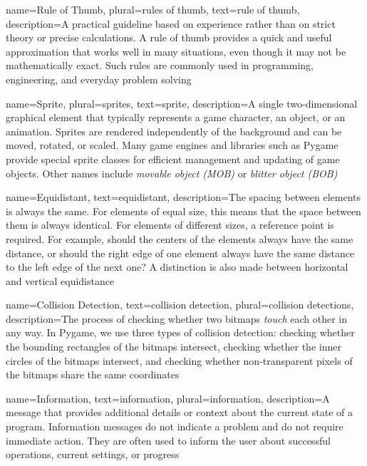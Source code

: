 {
	name={Rule of Thumb},
	plural={rules of thumb},
	text={rule of thumb},
	description={A practical guideline based on experience rather than on strict theory or precise calculations. A rule of thumb provides a quick and useful approximation that works well in many situations, even though it may not be mathematically exact. Such rules are commonly used in programming, engineering, and everyday problem solving}
}

{
	name={Sprite},
	plural={sprites},
	text={sprite},
	description={A single two-dimensional graphical element that typically represents a game character, an object, or an animation. Sprites are rendered independently of the background and can be moved, rotated, or scaled. Many game engines and libraries such as Pygame provide special	sprite classes for efficient management and updating of game objects. Other names include \emph{movable object (MOB)} or \emph{blitter object (BOB)}}
}

{
	name={Equidistant},
	text={equidistant},
	description={The spacing between elements is always the same. For elements of equal size, this means that the space between them is always identical. For elements of different sizes, a reference point is required. For example, should the centers of the elements always have the same distance, or should the right edge of one element always have the same distance to the left edge of the next one? A distinction is also made between horizontal and vertical 	equidistance}
}

{
	name={Collision Detection},
	text={collision detection},
	plural={collision detections},
	description={The process of checking whether two bitmaps \emph{touch} each other in any way. In Pygame, we use three types of collision detection: checking whether the bounding rectangles of the bitmaps intersect, checking whether the inner circles of the bitmaps intersect, and checking whether non-transparent pixels of the bitmaps share the same coordinates}
}

{
	name={Information},
	text={information},
	plural={information},
	description={A message that provides additional details or context about the current state of a program. Information messages do not indicate a problem and do not require 	immediate action. They are often used to inform the user about successful operations,	current settings, or progress}
}

